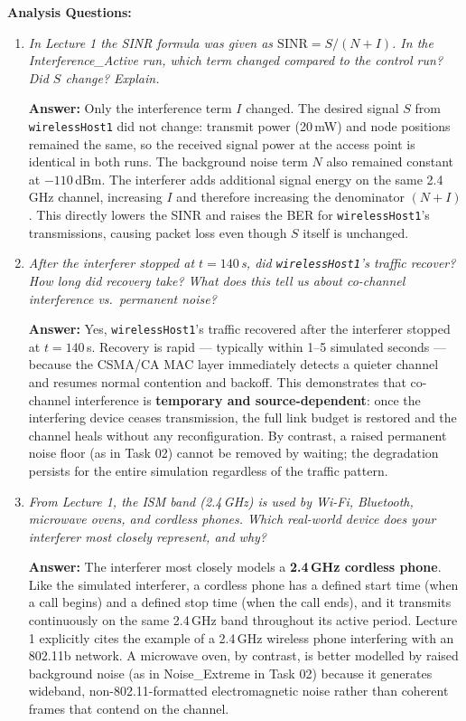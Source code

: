 \documentclass[12pt]{article}
\begin{document}
\textbf{Analysis Questions:}
\begin{enumerate}

    \item \textit{In Lecture 1 the SINR formula was given as
          $\mathrm{SINR} = S/(N+I)$. In the Interference\_Active run, which term
          changed compared to the control run? Did $S$ change? Explain.}

    \textbf{Answer:}
    Only the interference term \textbf{$I$} changed. The desired signal $S$ from
    \texttt{wirelessHost1} did not change: transmit power (20\,mW) and node
    positions remained the same, so the received signal power at the access point
    is identical in both runs. The background noise term $N$ also remained constant
    at $-110$\,dBm. The interferer adds additional signal energy on the same
    2.4\,GHz channel, increasing $I$ and therefore increasing the denominator
    $(N+I)$. This directly lowers the SINR and raises the BER for
    \texttt{wirelessHost1}'s transmissions, causing packet loss even though $S$
    itself is unchanged.

    \item \textit{After the interferer stopped at $t = 140$\,s, did
          \texttt{wirelessHost1}'s traffic recover? How long did recovery take?
          What does this tell us about co-channel interference vs.\ permanent
          noise?}

    \textbf{Answer:}
    Yes, \texttt{wirelessHost1}'s traffic recovered after the interferer stopped
    at $t = 140$\,s. Recovery is rapid --- typically within 1--5 simulated
    seconds --- because the CSMA/CA MAC layer immediately detects a quieter
    channel and resumes normal contention and backoff. This demonstrates that
    co-channel interference is \textbf{temporary and source-dependent}: once the
    interfering device ceases transmission, the full link budget is restored and
    the channel heals without any reconfiguration. By contrast, a raised
    permanent noise floor (as in Task 02) cannot be removed by waiting; the
    degradation persists for the entire simulation regardless of the traffic
    pattern.

    \item \textit{From Lecture 1, the ISM band (2.4\,GHz) is used by Wi-Fi,
          Bluetooth, microwave ovens, and cordless phones. Which real-world device
          does your interferer most closely represent, and why?}

    \textbf{Answer:}
    The interferer most closely models a \textbf{2.4\,GHz cordless phone}. Like
    the simulated interferer, a cordless phone has a defined start time (when a
    call begins) and a defined stop time (when the call ends), and it transmits
    continuously on the same 2.4\,GHz band throughout its active period. Lecture 1
    explicitly cites the example of a 2.4\,GHz wireless phone interfering with an
    802.11b network. A microwave oven, by contrast, is better modelled by raised
    background noise (as in Noise\_Extreme in Task 02) because it generates
    wideband, non-802.11-formatted electromagnetic noise rather than coherent
    frames that contend on the channel.


\end{enumerate}
\end{document}
